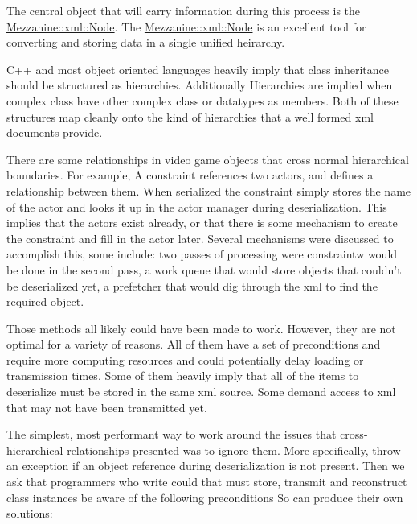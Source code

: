 The central object that will carry information during this process is the \hyperlink{classMezzanine_1_1xml_1_1Node}{Mezzanine::xml::Node}. The \hyperlink{classMezzanine_1_1xml_1_1Node}{Mezzanine::xml::Node} is an excellent tool for converting and storing data in a single unified heirarchy. \par
 \par
 C++ and most object oriented languages heavily imply that class inheritance should be structured as hierarchies. Additionally Hierarchies are implied when complex class have other complex class or datatypes as members. Both of these structures map cleanly onto the kind of hierarchies that a well formed xml documents provide. \par
 \par
 There are some relationships in video game objects that cross normal hierarchical boundaries. For example, A constraint references two actors, and defines a relationship between them. When serialized the constraint simply stores the name of the actor and looks it up in the actor manager during deserialization. This implies that the actors exist already, or that there is some mechanism to create the constraint and fill in the actor later. Several mechanisms were discussed to accomplish this, some include: two passes of processing were constraintw would be done in the second pass, a work queue that would store objects that couldn't be deserialized yet, a prefetcher that would dig through the xml to find the required object. \par
 \par
 Those methods all likely could have been made to work. However, they are not optimal for a variety of reasons. All of them have a set of preconditions and require more computing resources and could potentially delay loading or transmission times. Some of them heavily imply that all of the items to deserialize must be stored in the same xml source. Some demand access to xml that may not have been transmitted yet. \par
 \par
 The simplest, most performant way to work around the issues that cross-\/hierarchical relationships presented was to ignore them. More specifically, throw an exception if an object reference during deserialization is not present. Then we ask that programmers who write could that must store, transmit and reconstruct class instances be aware of the following preconditions So can produce their own solutions:
